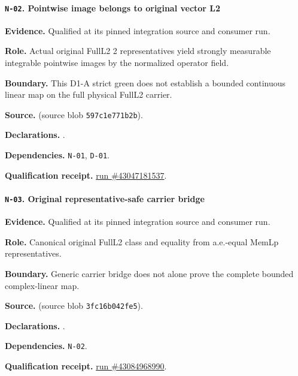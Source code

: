 \paragraph{\texttt{N-02}. Pointwise image belongs to original vector L2}
\noindent\textbf{Evidence.} Qualified at its pinned integration source and consumer run.
\par\noindent\textbf{Role.} Actual original FullL2 2 representatives yield strongly measurable integrable pointwise images by the normalized operator field.
\par\noindent\textbf{Boundary.} This D1-A strict green does not establish a bounded continuous linear map on the full physical FullL2 carrier.
\par\noindent\textbf{Source.}  (source blob \texttt{597c1e771b2b}).
\par\noindent\textbf{Declarations.} .
\par\noindent\textbf{Dependencies.} \texttt{N-01}, \texttt{D-01}.
\par\noindent\textbf{Qualification receipt.} \href{https://github.com/etblink/math/actions/runs/43047181537}{run \#43047181537}.
\medskip

\paragraph{\texttt{N-03}. Original representative-safe carrier bridge}
\noindent\textbf{Evidence.} Qualified at its pinned integration source and consumer run.
\par\noindent\textbf{Role.} Canonical original FullL2 class and equality from a.e.-equal MemLp representatives.
\par\noindent\textbf{Boundary.} Generic carrier bridge does not alone prove the complete bounded complex-linear map.
\par\noindent\textbf{Source.}  (source blob \texttt{3fc16b042fe5}).
\par\noindent\textbf{Declarations.} .
\par\noindent\textbf{Dependencies.} \texttt{N-02}.
\par\noindent\textbf{Qualification receipt.} \href{https://github.com/etblink/math/actions/runs/43084968990}{run \#43084968990}.
\medskip

